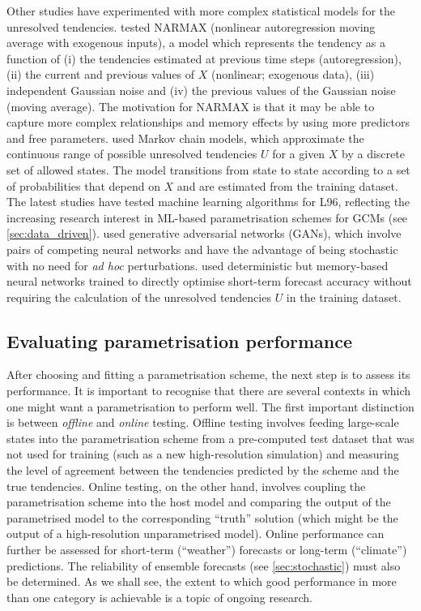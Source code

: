\documentclass[titlepage,twoside]{article}
\numberwithin{equation}{section}
\begin{document}
Other studies have experimented with more complex statistical models for the
unresolved tendencies. \textcite{chorin2015} tested NARMAX (nonlinear
autoregression moving average with exogenous inputs), a model which represents
the tendency as a function of (i) the tendencies estimated at previous time
steps (autoregression), (ii) the current and previous values of $X$ (nonlinear;
exogenous data), (iii) independent Gaussian noise and (iv) the previous values
of the Gaussian noise (moving average). The motivation for NARMAX is that it
may be able to capture more complex relationships and memory effects by using
more predictors and free parameters. \textcite{crommelin2008,kwasniok2012} used
Markov chain models, which approximate the continuous range of possible
unresolved tendencies $U$ for a given $X$ by a discrete set of allowed states.
The model transitions from state to state according to a set of probabilities
that depend on $X$ and are estimated from the training dataset. The latest
studies have tested machine learning algorithms for L96, reflecting the
increasing research interest in ML-based parametrisation schemes for GCMs (see
\cref{sec:data_driven}). \textcite{gagne2020} used generative adversarial
networks (GANs), which involve pairs of competing neural networks and have the
advantage of being stochastic with no need for \emph{ad hoc} perturbations.
\textcite{bhouri2023} used deterministic but memory-based neural networks
trained to directly optimise short-term forecast accuracy without requiring
the calculation of the unresolved tendencies $U$ in the training dataset.


\subsection{Evaluating parametrisation performance}
After choosing and fitting a parametrisation scheme, the next step is to assess
its performance. It is important to recognise that there are several contexts
in which one might want a parametrisation to perform well. The first important
distinction is between \emph{offline} and \emph{online} testing. Offline
testing involves feeding large-scale states into the parametrisation scheme
from a pre-computed test dataset that was not used for training (such as a new
high-resolution simulation) and measuring the level of agreement between the
tendencies predicted by the scheme and the true tendencies. Online testing, on
the other hand, involves coupling the parametrisation scheme into the host
model and comparing the output of the parametrised model to the corresponding
``truth'' solution (which might be the output of a high-resolution
unparametrised model). Online performance can further be assessed for
short-term (``weather'') forecasts or long-term (``climate'') predictions. The
reliability of ensemble forecasts (see \cref{sec:stochastic}) must also be
determined. As we shall see, the extent to which good performance in more than
one category is achievable is a topic of ongoing research.
\end{document}
